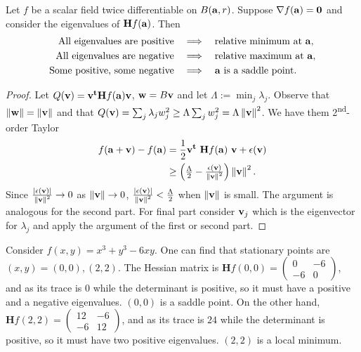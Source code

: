 \begin{theorem}
    Let \(f\) be a scalar field twice differentiable on \(B(\aa,r)\).
    Suppose  \(\nabla f(\aa) = \mathbf{0}\) and consider the eigenvalues of  \(\mathbf{H} f (\aa)\).
    Then
    \[
        \begin{aligned}
            \text{{All} eigenvalues are positive}
             & \quad \Longrightarrow \quad
            \text{relative minimum at \(\aa\)}, \\
            \text{{All} eigenvalues are negative}
             & \quad \Longrightarrow \quad
            \text{relative maximum at \(\aa\)}, \\
            \text{Some positive, some negative}
             & \quad \Longrightarrow \quad
            \text{\(\aa\) is a saddle point}.
        \end{aligned}
    \]
\end{theorem}

\begin{proof}
    Let \(Q(\vv) =  \vv^{\mathbf{t}} \mathbf{H} f (\aa) \vv  \),  \(\ww = B \vv\) and let \(\Lambda := \min_j \lambda_j\).
    Observe that \(\norm{\ww} =  \norm{\vv}\) and that \(Q(\vv)=  \sum_{j} \lambda_j w_j^2  \geq \Lambda \sum_{j} w_j^2 = \Lambda  \norm{\vv}^2 \).
    We have them 2\textsuperscript{nd}-order Taylor
    \[
        \begin{aligned}
            f(\aa+\vv) - f(\aa)
             & =  \frac{1}{2} \vv^{\mathbf{t}} \ \mathbf{H} f (\aa) \ \vv +  \epsilon(\vv)                \\
             & \geq  \left(\tfrac{\Lambda}{2} - \tfrac{\epsilon(\vv)}{\norm{\vv}^2} \right) \norm{\vv}^2.
        \end{aligned}
    \]
    Since \(\frac{\abs{\epsilon(\vv)}}{\norm{\vv}^2} \to 0\) as \(\norm{\vv}\to 0\), \( \frac{\abs{\epsilon(\vv)}}{\norm{\vv}^2} < \tfrac{\Lambda}{2}\) when \(\norm{\vv}\) is small.
    The argument is analogous for the second part. For final part consider \(\vv_j\) which is the eigenvector for \(\lambda_j\) and apply the argument of the first or second part.
\end{proof}

\begin{example}
 Consider $f(x,y) = x^3 + y^3 - 6xy$.
 One can find that stationary points are $(x,y) = (0,0), (2,2)$.
 The Hessian matrix is
 $\mathbf{H} f(0,0) = \begin{pmatrix} 0 & -6 \\ -6 & 0\end{pmatrix}$,
 and as its trace is $0$ while the determinant is positive, so it must have a positive and a negative eigenvalues.
 $(0,0)$ is a saddle point.
 On the other hand,
 $\mathbf{H} f(2,2) = \begin{pmatrix} 12 & -6 \\ -6 & 12\end{pmatrix}$,
 and as its trace is $24$ while the determinant is positive, so it must have two positive eigenvalues.
 $(2,2)$ is a local minimum. 
 
\end{example}


